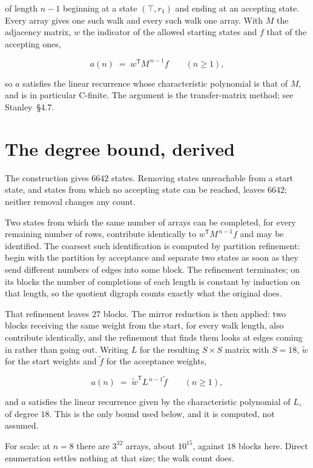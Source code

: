 \documentclass[11pt]{article}
\theoremstyle{definition}
\begin{document}
of length $n-1$ beginning at a state $(\top,r_1)$ and ending at an accepting state. Every array gives one such walk and every such walk one array. With $M$ the adjacency matrix, $w$ the indicator of the allowed starting states and $f$ that of the accepting ones,

\[a(n) \;=\; w^{\mathsf T} M^{\,n-1} f \qquad (n \ge 1),\]

so $a$ satisfies the linear recurrence whose characteristic polynomial is that of $M$, and is in particular C-finite. The argument is the transfer-matrix method; see Stanley~\S4.7.

\section{The degree bound, derived}

The construction gives $6642$ states. Removing states unreachable from a start state, and states from which no accepting state can be reached, leaves $6642$; neither removal changes any count.

Two states from which the same number of arrays can be completed, for every remaining number of rows, contribute identically to $w^{\mathsf T}M^{\,n-1}f$ and may be identified. The coarsest such identification is computed by partition refinement: begin with the partition by acceptance and separate two states as soon as they send different numbers of edges into some block. The refinement terminates; on its blocks the number of completions of each length is constant by induction on that length, so the quotient digraph counts exactly what the original does.

That refinement leaves $27$ blocks. The mirror reduction is then applied: two blocks receiving the same weight from the start, for every walk length, also contribute identically, and the refinement that finds them looks at edges coming in rather than going out. Writing $L$ for the resulting $S \times S$ matrix with $S = 18$, $\tilde w$ for the start weights and $\tilde f$ for the acceptance weights,

\[a(n) \;=\; \tilde w^{\mathsf T} L^{\,n-1} \tilde f \qquad (n \ge 1),\]

and $a$ satisfies the linear recurrence given by the characteristic polynomial of $L$, of degree $18$. This is the only bound used below, and it is computed, not assumed.

For scale: at $n = 8$ there are $3^{32}$ arrays, about $10^{15}$, against $18$ blocks here. Direct enumeration settles nothing at that size; the walk count does.
\end{document}
